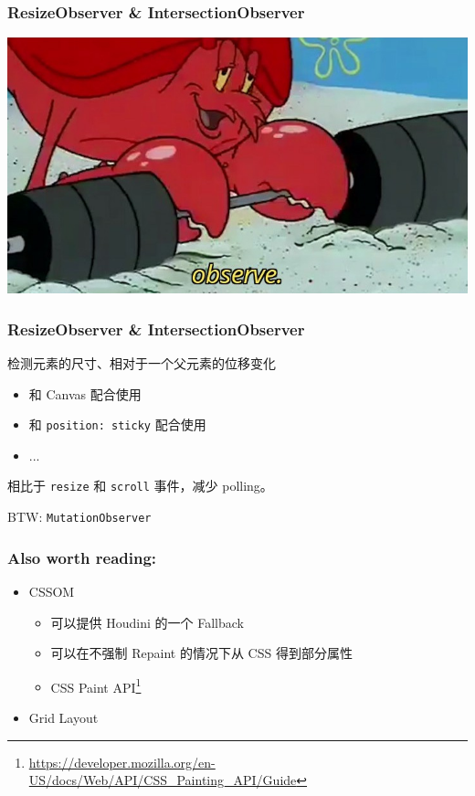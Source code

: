 \documentclass[UTF-8]{ctexbeamer}
\begin{document}
\begin{frame}
  \frametitle{ResizeObserver \& IntersectionObserver}
  \includegraphics[width=\textwidth]{assets/OBSERVE.jpg}
\end{frame}

\begin{frame}
  \frametitle{ResizeObserver \& IntersectionObserver}

  检测元素的尺寸、相对于一个父元素的位移变化
  
  \vspace{2em}

  \begin{itemize}
    \pause
    \item 和 Canvas 配合使用
    \pause
    \item 和 \texttt{position: sticky} 配合使用
    \item ...
  \end{itemize}

  \vspace{2em}
  \pause

  相比于 \texttt{resize} 和 \texttt{scroll} 事件，减少 polling。

  \vspace{2em}
  \pause

  BTW: \texttt{MutationObserver}
\end{frame}

\begin{frame}
  \frametitle{Also worth reading:}
  \begin{itemize}
    \item CSSOM
    \begin{itemize}
      \item 可以提供 Houdini 的一个 Fallback
      \item 可以在不强制 Repaint 的情况下从 CSS 得到部分属性
      \item CSS Paint API\footnote{\url{https://developer.mozilla.org/en-US/docs/Web/API/CSS_Painting_API/Guide}}
    \end{itemize}
    \item Grid Layout
  \end{itemize}
\end{frame}
\end{document}

